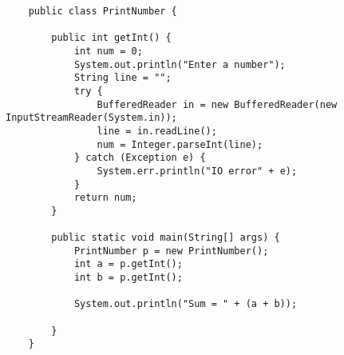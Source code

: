 \documentclass{book}
\begin{document}
{\begin{verbatim}
    public class PrintNumber {

        public int getInt() {
            int num = 0;
            System.out.println("Enter a number");
            String line = "";
            try {
                BufferedReader in = new BufferedReader(new InputStreamReader(System.in));
                line = in.readLine();
                num = Integer.parseInt(line);
            } catch (Exception e) {
                System.err.println("IO error" + e);
            }
            return num;
        }

        public static void main(String[] args) {
            PrintNumber p = new PrintNumber();
            int a = p.getInt();
            int b = p.getInt();

            System.out.println("Sum = " + (a + b));

        }
    }


\end{verbatim}}
\end{document}
